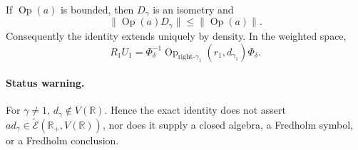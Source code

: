 If \(\operatorname{Op}(a)\) is bounded, then \(D_\gamma\) is an isometry and
\[
 \|\operatorname{Op}(a)D_\gamma\|
 \leq\|\operatorname{Op}(a)\|.
\]
Consequently the identity extends uniquely by density.  In the weighted
space,
\[
 R_1U_1
 =\Phi_\delta^{-1}
   \operatorname{Op}_{\mathrm{right}\text{-}\gamma_1}
   (r_1,d_{\gamma_1})
   \Phi_\delta.
\]

\paragraph{Status warning.}
For \(\gamma\ne1\), \(d_\gamma\notin V(\mathbb R)\).  Hence the exact
identity does not assert
\(a d_\gamma\in\widetilde{\mathcal E}(\mathbb R_+,V(\mathbb R))\), nor does
it supply a closed algebra, a Fredholm symbol, or a Fredholm conclusion.
